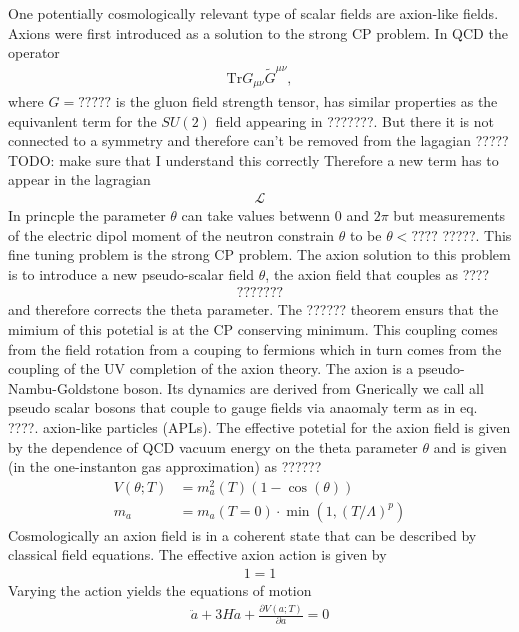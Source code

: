 \documentclass[13pt,a4paper,twoside,titlepage]{article}
\begin{document}
One potentially cosmologically relevant type of scalar fields are axion-like fields.
Axions were first introduced as a solution to the strong CP problem.
In QCD the operator
\begin{align}
    \mathrm{Tr} G_{\mu \nu} \tilde{G}^{\mu \nu},
\end{align}
where $G = ?????$ is the gluon field strength tensor,
has similar properties as the equivanlent term for the $SU(2)$ field appearing
in ???????. But there it is not connected to a symmetry and therefore can't
be removed from the lagagian ????? TODO: make sure that I understand this correctly
Therefore a new term has to appear in the lagragian
\begin{align}
    \mathcal{L}
\end{align}
In princple the parameter $\theta$ can take values betwenn 0 and $2\pi$ but measurements of the electric dipol moment of the neutron constrain $\theta$ to
be $\theta < ????$ ?????.
This fine tuning problem is the strong CP problem.
The axion solution to this problem is to introduce a new pseudo-scalar field
$\theta$, the axion field that couples as ????
\begin{align}
    ???????
\end{align}
and therefore corrects the theta parameter. The ?????? theorem ensurs that
the mimium of this potetial is at the CP conserving minimum.
This coupling comes from the field rotation from a couping to fermions which in turn comes from
the coupling of the UV completion of the axion theory.
The axion is a pseudo-Nambu-Goldstone boson. Its dynamics are derived from
Gnerically we call all pseudo scalar bosons that couple to gauge fields via anaomaly term as in eq. ????.
axion-like particles (APLs).
The effective potetial for the axion field is given by the dependence of QCD vacuum energy
on the theta parameter $\theta$ and is given (in the one-instanton gas approximation) as ??????
\begin{align}
    V(\theta; T) &= m_a^2(T) (1 - \cos(\theta)) \\
    m_a &= m_a(T = 0) \cdot \min\left(1, \left( T / \Lambda \right)^p \right)
\end{align}
Cosmologically an axion field is in a coherent state that can be described by classical field equations.
The effective axion action is given by
\begin{align}
    1 = 1
\end{align}
Varying the action yields the equations of motion
\begin{align}
    \ddot{a} + 3 H \dot{a} + \frac{\partial V(a; T)}{\partial a} = 0
\end{align}
\end{document}

